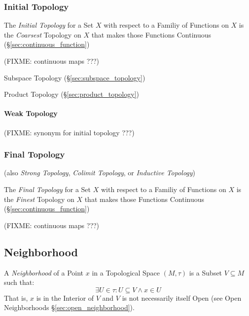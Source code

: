 \subsubsection{Initial Topology}\label{sec:initial_topology}

The \emph{Initial Topology} for a Set $X$ with respect to a Familiy of
Functions on $X$ is the \emph{Coarsest} Topology on $X$ that makes those
Functions Continuous (\S\ref{sec:continuous_function})

(FIXME: continuous maps ???)

Subspace Topology (\S\ref{sec:subspace_topology})

Product Topology (\S\ref{sec:product_topology})



\paragraph{Weak Topology}\label{sec:weak_topology}

(FIXME: synonym for initial topology ???)



\subsubsection{Final Topology}\label{sec:final_topology}

(also \emph{Strong Topology}, \emph{Colimit Topology}, or
\emph{Inductive Topology})

The \emph{Final Topology} for a Set $X$ with respect to a Familiy of
Functions on $X$ is the \emph{Finest} Topology on $X$ that makes those
Functions Continuous (\S\ref{sec:continuous_function})

(FIXME: continuous maps ???)



\subsection{Neighborhood}\label{sec:neighborhood}

A \emph{Neighborhood} of a Point $x$ in a Topological Space $(M,\tau)$
is a Subset $V \subseteq M$ such that:
\[
  \exists U \in \tau : U \subseteq V \wedge x \in U
\]
That is, $x$ is in the Interior of $V$ and $V$ is not necessarily
itself Open (see Open Neighborhoods \S\ref{sec:open_neighborhood}).

